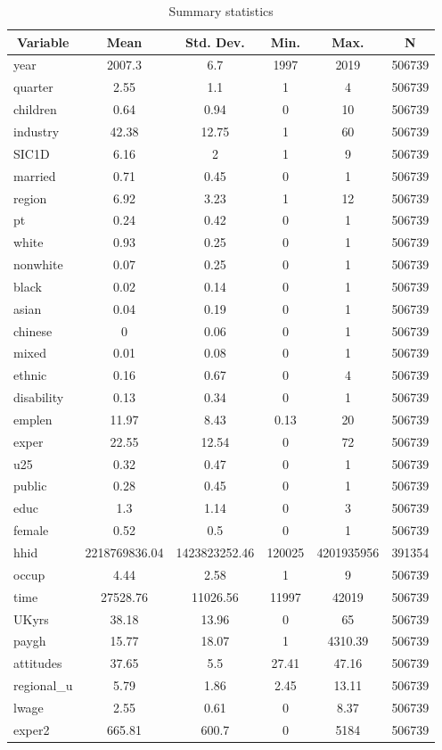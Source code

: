 
\begin{table}[htbp]\centering \caption{Summary statistics \label{sumstats}}
\begin{tabular}{l c c c c c}\hline\hline
\multicolumn{1}{c}{\textbf{Variable}} & \textbf{Mean}
 & \textbf{Std. Dev.}& \textbf{Min.} &  \textbf{Max.} & \textbf{N}\\ \hline
year & 2007.3 & 6.7 & 1997 & 2019 & 506739\\
quarter & 2.55 & 1.1 & 1 & 4 & 506739\\
children & 0.64 & 0.94 & 0 & 10 & 506739\\
industry & 42.38 & 12.75 & 1 & 60 & 506739\\
SIC1D & 6.16 & 2 & 1 & 9 & 506739\\
married & 0.71 & 0.45 & 0 & 1 & 506739\\
region & 6.92 & 3.23 & 1 & 12 & 506739\\
pt & 0.24 & 0.42 & 0 & 1 & 506739\\
white & 0.93 & 0.25 & 0 & 1 & 506739\\
nonwhite & 0.07 & 0.25 & 0 & 1 & 506739\\
black & 0.02 & 0.14 & 0 & 1 & 506739\\
asian & 0.04 & 0.19 & 0 & 1 & 506739\\
chinese & 0 & 0.06 & 0 & 1 & 506739\\
mixed & 0.01 & 0.08 & 0 & 1 & 506739\\
ethnic & 0.16 & 0.67 & 0 & 4 & 506739\\
disability & 0.13 & 0.34 & 0 & 1 & 506739\\
emplen & 11.97 & 8.43 & 0.13 & 20 & 506739\\
exper & 22.55 & 12.54 & 0 & 72 & 506739\\
u25 & 0.32 & 0.47 & 0 & 1 & 506739\\
public & 0.28 & 0.45 & 0 & 1 & 506739\\
educ & 1.3 & 1.14 & 0 & 3 & 506739\\
female & 0.52 & 0.5 & 0 & 1 & 506739\\
hhid & 2218769836.04 & 1423823252.46 & 120025 & 4201935956 & 391354\\
occup & 4.44 & 2.58 & 1 & 9 & 506739\\
time & 27528.76 & 11026.56 & 11997 & 42019 & 506739\\
UKyrs & 38.18 & 13.96 & 0 & 65 & 506739\\
paygh & 15.77 & 18.07 & 1 & 4310.39 & 506739\\
attitudes & 37.65 & 5.5 & 27.41 & 47.16 & 506739\\
regional\_u & 5.79 & 1.86 & 2.45 & 13.11 & 506739\\
lwage & 2.55 & 0.61 & 0 & 8.37 & 506739\\
exper2 & 665.81 & 600.7 & 0 & 5184 & 506739\\
\hline\end{tabular}
\label{tab:sumstats}
\end{table}
